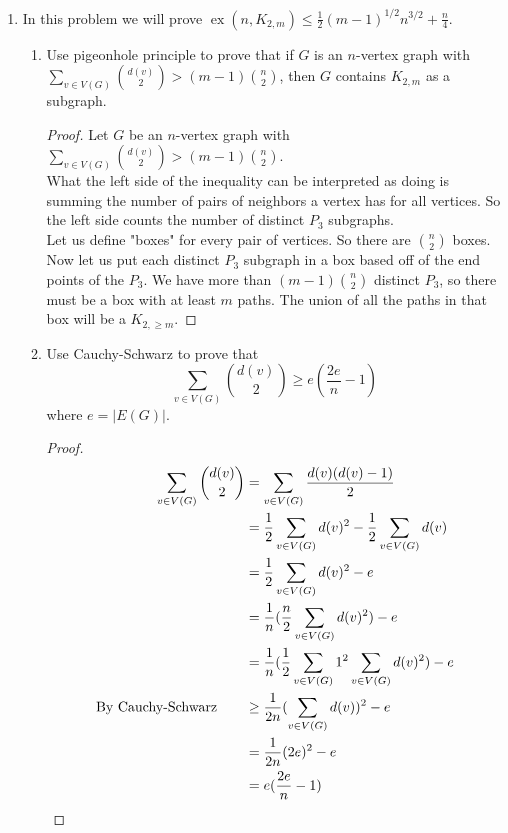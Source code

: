 \documentclass[12pt]{article}
\begin{document}
\begin{enumerate}
\item In this problem we will prove $\operatorname{ex}(n, K_{2,m}) \leq \frac{1}{2}(m-1)^{1/2} n^{3/2} + \frac{n}{4}$.
\begin{enumerate}
\item Use pigeonhole principle to prove that if $G$ is an $n$-vertex graph with $\sum_{v \in V(G)} {d(v) \choose 2} > (m-1){n \choose 2}$, then $G$ contains $K_{2,m}$ as a subgraph. 
\begin{proof}
	Let $G$ be an $n$-vertex graph with $\sum_{v \in V(G)} {d(v) \choose 2} > (m-1){n \choose 2}$.\\
	What the left side of the inequality can be interpreted as doing is summing the number of pairs of neighbors a vertex has for all vertices. So the left side counts the number of distinct $P_3$ subgraphs.\\
	Let us define "boxes" for every pair of vertices. So there are ${n\choose2}$ boxes. Now let us put each distinct $P_3$ subgraph in a box based off of the end points of the $P_3$. We have more than $(m-1){n\choose2}$ distinct $P_3$, so there must be a box with at least $m$ paths. The union of all the paths in that box will be a $K_{2,\geq m}$.
\end{proof}
\item Use Cauchy-Schwarz to prove that \[\sum_{v \in V(G)} {d(v) \choose 2} \geq e\left(\frac{2e}{n} - 1\right)\] where $e =|E(G)|$.

\begin{proof}
	
	\begin{align*}
		\sum_{v \in V(G)} {d(v) \choose 2} 
		&= \sum_{v \in V(G)} \frac{d(v)(d(v)-1)}{2}\\
		&= \frac{1}{2} \sum_{v \in V(G)} d(v)^2 - \frac{1}{2} \sum_{v \in V(G)} d(v)\\
		&= \frac{1}{2} \sum_{v \in V(G)} d(v)^2 - e\\
		&= \frac{1}{n}(\frac{n}{2} \sum_{v \in V(G)} d(v)^2) - e\\
		&= \frac{1}{n}(\frac{1}{2} \sum_{v \in V(G)}1^2 \sum_{v \in V(G)} d(v)^2) - e\\
		\text{By Cauchy-Schwarz\qquad} &\geq \frac{1}{2n} (\sum_{v \in V(G)}d(v))^2 - e\\
		&= \frac{1}{2n} (2e)^2 - e\\
		&= e(\frac{2e}{n} - 1)
	\end{align*}
\end{proof}


\end{enumerate}
\end{enumerate}
\end{document}
